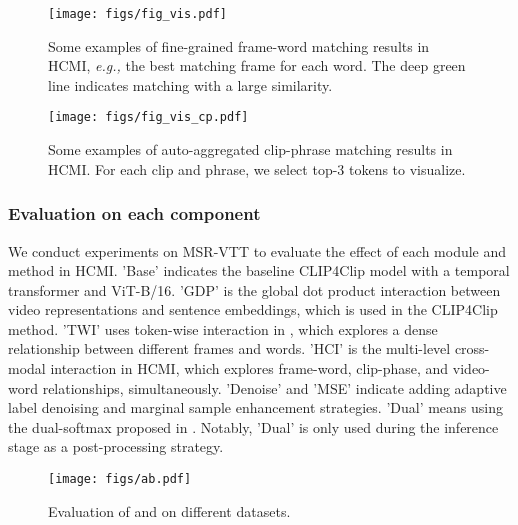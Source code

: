 \documentclass{article}
\begin{document}
\begin{figure*}[h]
    \centering
    \texttt{[image: figs/fig\_vis.pdf]}
    \caption{Some examples of fine-grained frame-word matching results in HCMI, \emph{e.g.,} the best matching frame for each word. The deep green line indicates matching with a large similarity.}
    \label{fig:vis}
\end{figure*}

\begin{figure*}[h]
    \centering
    \texttt{[image: figs/fig\_vis\_cp.pdf]}
    \caption{Some examples of auto-aggregated clip-phrase matching results in HCMI. For each clip and phrase, we select top-3 tokens to visualize.}
    \label{fig:vis_cp}
\end{figure*}

\subsubsection{Evaluation on each component}
We conduct experiments on MSR-VTT to evaluate the effect of each module and method in HCMI.
'Base' indicates the baseline CLIP4Clip model with a temporal transformer and ViT-B/16.
'GDP' is the global dot product interaction between video representations and sentence embeddings, which is used in the CLIP4Clip method.
'TWI' uses token-wise interaction in \cite{wang2022disentangled}, which explores a dense relationship between different frames and words.
'HCI' is the multi-level cross-modal interaction in HCMI, which explores frame-word, clip-phase, and video-word relationships, simultaneously.
'Denoise' and 'MSE' indicate adding adaptive label denoising and marginal sample enhancement strategies.
'Dual' means using the dual-softmax proposed in \cite{cheng2021improving}.
Notably, 'Dual' is only used during the inference stage as a post-processing strategy.


\begin{figure*}[h]
    \centering
    \texttt{[image: figs/ab.pdf]}
    \caption{Evaluation of  and  on different datasets.}
    \label{fig:ab}
\end{figure*}
\end{document}

